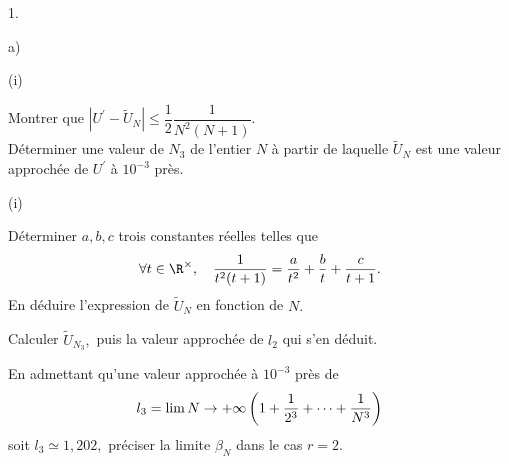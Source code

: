 \documentclass[11pt]{article}%
\begin{document}
\begin{noliste}{1.}
\begin{noliste}{a)}
\begin{nonoliste}{(i)}
\item Montrer que $\left| U^{\prime }-\widetilde{U}_{N}\right|
\leq \dfrac{1}{2}\dfrac{1}{N^{2}(N + 1)}.$\\
Déterminer une valeur de $N_{3}$ de l'entier $N$ à partir de laquelle
$\widetilde{U}_{N}$ est une valeur approchée de $U^{\prime }$ à
$10^{-3}$ près.
\end{nonoliste}

\item 

\begin{nonoliste}{(i)}
\item Déterminer $a,b,c$ trois constantes réelles telles que 
\[
\forall t\in \R^{\times },\quad \dfrac{1}{t^{2}(t + 1)} =
\dfrac{a}{t^{2}} + \dfrac{b}{t} + \dfrac{c}{t + 1}.
\]
En déduire l'expression de $\widetilde{U}_{N}$ en fonction de $N.$

\item Calculer $\widetilde{U}_{N_{3}},$ puis la valeur approchée de
$l_{2}$
qui s'en déduit.

\item En admettant qu'une valeur approchée à $10^{-3}$ près de 
\[
l_{3} = \lim{N\rightarrow + \infty }\left( 1 + \dfrac{1}{2^{3}} +
\cdots + \dfrac{1}{N^{3}}\right) 
\]
soit $l_{3}\simeq 1,202,$ préciser la limite $\beta_{N}$ dans le cas $r
= 2.$
\end{nonoliste}
\end{noliste}
\end{noliste}

\label{fin}
\end{document}
